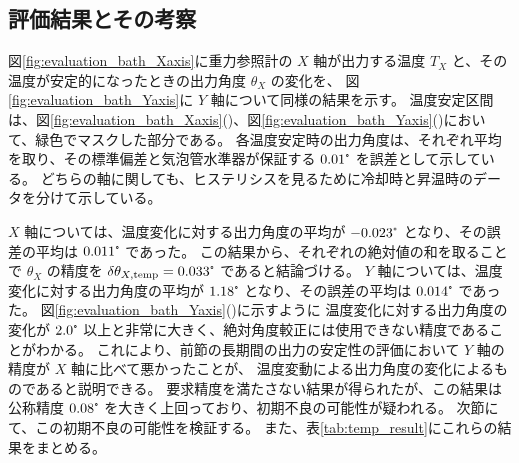 \documentclass[../../main.tex]{subfiles}
\begin{document}
\subsection{評価結果とその考察}
図\ref{fig:evaluation_bath_Xaxis}に重力参照計の $X$ 軸が出力する温度 $T_{X}$ と、その温度が安定的になったときの出力角度 $\theta_{X}$ の変化を、
図\ref{fig:evaluation_bath_Yaxis}に $Y$ 軸について同様の結果を示す。
温度安定区間は、図\ref{fig:evaluation_bath_Xaxis}()、図\ref{fig:evaluation_bath_Yaxis}()において、緑色でマスクした部分である。
各温度安定時の出力角度は、それぞれ平均を取り、その標準偏差と気泡管水準器が保証する $0.01\tcdegree$ を誤差として示している。
どちらの軸に関しても、ヒステリシスを見るために冷却時と昇温時のデータを分けて示している。

$X$ 軸については、温度変化に対する出力角度の平均が $-0.023\tcdegree$ となり、その誤差の平均は $0.011\tcdegree$ であった。
この結果から、それぞれの絶対値の和を取ることで $\theta_{X}$ の精度を 
$\delta\theta_{X,\mathrm{temp}} = 0.033\tcdegree$ であると結論づける。
$Y$ 軸については、温度変化に対する出力角度の平均が $1.18\tcdegree$ となり、その誤差の平均は $0.014\tcdegree$ であった。
図\ref{fig:evaluation_bath_Yaxis}()に示すように
温度変化に対する出力角度の変化が $2.0\tcdegree$ 以上と非常に大きく、絶対角度較正には使用できない精度であることがわかる。
これにより、前節の長期間の出力の安定性の評価において $Y$ 軸の精度が $X$ 軸に比べて悪かったことが、
温度変動による出力角度の変化によるものであると説明できる。
要求精度を満たさない結果が得られたが、この結果は公称精度 $0.08\tcdegree$ を大きく上回っており、初期不良の可能性が疑われる。
次節にて、この初期不良の可能性を検証する。
また、表\ref{tab:temp_result}にこれらの結果をまとめる。
\end{document}
